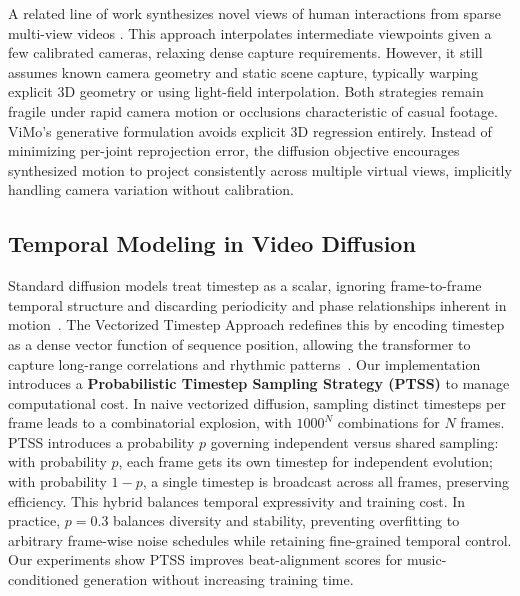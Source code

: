 A related line of work synthesizes novel views of human interactions from sparse multi-view videos \cite{nvshismv2022}. This approach interpolates intermediate viewpoints given a few calibrated cameras, relaxing dense capture requirements. However, it still assumes known camera geometry and static scene capture, typically warping explicit 3D geometry or using light-field interpolation. Both strategies remain fragile under rapid camera motion or occlusions characteristic of casual footage. ViMo's generative formulation avoids explicit 3D regression entirely. Instead of minimizing per-joint reprojection error, the diffusion objective encourages synthesized motion to project consistently across multiple virtual views, implicitly handling camera variation without calibration.

\subsection{Temporal Modeling in Video Diffusion}
Standard diffusion models treat timestep as a scalar, ignoring frame-to-frame temporal structure and discarding periodicity and phase relationships inherent in motion~\cite{ddpm2020}. The Vectorized Timestep Approach redefines this by encoding timestep as a dense vector function of sequence position, allowing the transformer to capture long-range correlations and rhythmic patterns~\cite{ptss2024}. Our implementation introduces a \textbf{Probabilistic Timestep Sampling Strategy (PTSS)} to manage computational cost. In naive vectorized diffusion, sampling distinct timesteps per frame leads to a combinatorial explosion, with $1000^N$ combinations for $N$ frames. PTSS introduces a probability $p$ governing independent versus shared sampling: with probability $p$, each frame gets its own timestep for independent evolution; with probability $1-p$, a single timestep is broadcast across all frames, preserving efficiency. This hybrid balances temporal expressivity and training cost. In practice, $p=0.3$ balances diversity and stability, preventing overfitting to arbitrary frame-wise noise schedules while retaining fine-grained temporal control. Our experiments show PTSS improves beat-alignment scores for music-conditioned generation without increasing training time.

